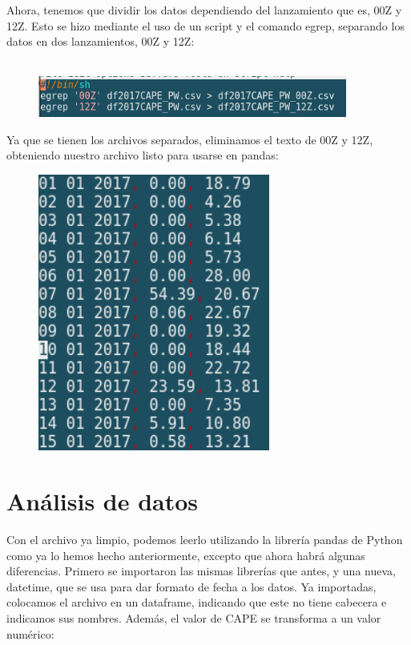 \documentclass[12pt]{article}
\begin{document}
Ahora, tenemos que dividir los datos dependiendo del lanzamiento que es, 00Z y 12Z. Esto se hizo mediante el uso de un script y el comando egrep, separando los datos en dos lanzamientos, 00Z y 12Z: \\ \\

\begin{figure}[h]
    \centering
\includegraphics[width=4in]{script2.png}
\end{figure}

Ya que se tienen los archivos separados, eliminamos el texto de 00Z y 12Z, obteniendo nuestro archivo listo para usarse en pandas:

\begin{figure}[h!]
    \centering
\includegraphics[width=3in]{3archivo.png}
\end{figure}

\section{Análisis de datos}
Con el archivo ya limpio, podemos leerlo utilizando la librería pandas de Python como ya lo hemos hecho anteriormente, excepto que ahora habrá algunas diferencias.  Primero se importaron las mismas librerías que antes, y una nueva, datetime, que se usa para dar formato de fecha a los datos. Ya importadas, colocamos el archivo en un dataframe, indicando que este no tiene cabecera e indicamos sus nombres. Además, el valor de CAPE se transforma a un valor numérico:
\end{document}
